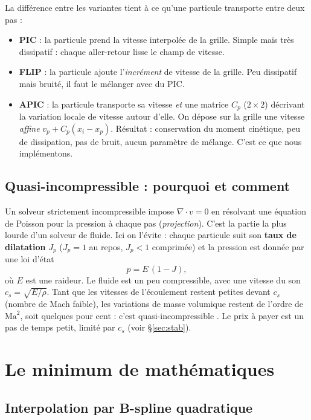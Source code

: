 \documentclass[11pt,a4paper]{article}
\begin{document}
La différence entre les variantes tient à ce qu'une particule transporte entre deux pas :
\begin{itemize}
  \item \textbf{PIC} : la particule prend la vitesse interpolée de la grille. Simple mais très
        dissipatif : chaque aller-retour lisse le champ de vitesse.
  \item \textbf{FLIP} : la particule ajoute l'\emph{incrément} de vitesse de la grille. Peu dissipatif
        mais bruité, il faut le mélanger avec du PIC.
  \item \textbf{APIC} : la particule transporte sa vitesse \emph{et} une matrice $C_p$ ($2\times 2$)
        décrivant la variation locale de vitesse autour d'elle. On dépose sur la grille une vitesse
        \emph{affine} $v_p + C_p (x_i - x_p)$. Résultat : conservation du moment cinétique, peu
        de dissipation, pas de bruit, aucun paramètre de mélange. C'est ce que nous implémentons.
\end{itemize}

\subsection{Quasi-incompressible : pourquoi et comment}

Un solveur strictement incompressible impose $\nabla\cdot v = 0$ en résolvant une équation de
Poisson pour la pression à chaque pas (\emph{projection}). C'est la partie la plus lourde d'un
solveur de fluide. Ici on l'évite : chaque particule suit son \textbf{taux de dilatation}
$J_p$ ($J_p = 1$ au repos, $J_p < 1$ comprimée) et la pression est donnée par une loi d'état
\[
  p = E\,(1 - J),
\]
où $E$ est une raideur. Le fluide est un peu compressible, avec une vitesse du son
$c_s = \sqrt{E/\rho}$. Tant que les vitesses de l'écoulement restent petites devant $c_s$
(nombre de Mach faible), les variations de masse volumique restent de l'ordre de $\mathrm{Ma}^2$,
soit quelques pour cent : c'est \og quasi-incompressible \fg. Le prix à payer est un pas de temps
petit, limité par $c_s$ (voir \S\ref{sec:stab}).

\section{Le minimum de mathématiques}

\subsection{Interpolation par B-spline quadratique}
\label{sec:bspline}
\end{document}
